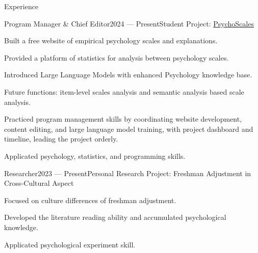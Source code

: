 \documentclass[
	11pt, %
]{resume} %
\begin{document}
\begin{rSection}{Experience}

    \begin{rSubsection}{Program Manager \& Chief Editor}{2024  --- Present}{Student Project: \href{https://psygscales.com/}{PsychoScales}}{}
        \item Built a free website of empirical psychology scales and explanations.
        \item Provided a platform of statistics for analysis between psychology scales.
        \item Introduced Large Language Models with enhanced Psychology knowledge base.
        \item Future functions: item-level scales analysis and semantic analysis based scale analysis.
        \item Practiced program management skills by coordinating website development, content editing, and large language model training, with project dashboard and timeline, leading the project orderly.
        \item Applicated psychology, statistics, and programming skills.
    \end{rSubsection}

    \begin{rSubsection}{Researcher}{2023 --- Present}{Personal Research Project: Freshman Adjustment in Cross-Cultural Aspect}{}
        \item Focused on culture differences of freshman adjustment.
        \item Developed the literature reading ability and accumulated psychological knowledge.
        \item Applicated psychological experiment skill.
    \end{rSubsection}



\end{rSection}
\end{document}
